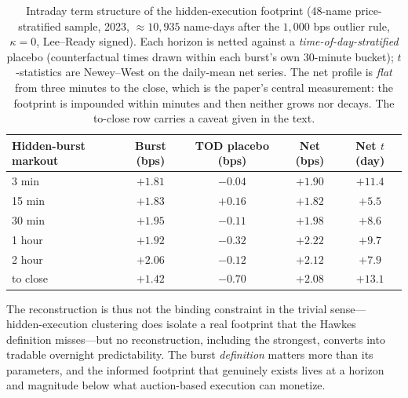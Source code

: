 \documentclass[11pt]{article}
\begin{document}
\begin{table}[htbp]
\centering
\begin{tabular}{lcccc}
\toprule
\textbf{Hidden-burst markout} & \textbf{Burst (bps)} & \textbf{TOD placebo (bps)} & \textbf{Net (bps)} & \textbf{Net $t$ (day)} \\
\midrule
3 min    & $+1.81$ & $-0.04$ & $+1.90$ & $+11.4$ \\
15 min   & $+1.83$ & $+0.16$ & $+1.82$ & $+5.5$ \\
30 min   & $+1.95$ & $-0.11$ & $+1.98$ & $+8.6$ \\
1 hour   & $+1.92$ & $-0.32$ & $+2.22$ & $+9.7$ \\
2 hour   & $+2.06$ & $-0.12$ & $+2.12$ & $+7.9$ \\
to close & $+1.42$ & $-0.70$ & $+2.08$ & $+13.1$ \\
\bottomrule
\end{tabular}
\caption{Intraday term structure of the hidden-execution footprint (48-name price-stratified sample, 2023, $\approx\!10{,}935$ name-days after the $1{,}000$ bps outlier rule, $\kappa=0$, Lee--Ready signed). Each horizon is netted against a \emph{time-of-day-stratified} placebo (counterfactual times drawn within each burst's own 30-minute bucket); $t$-statistics are Newey--West on the daily-mean net series. The net profile is \emph{flat} from three minutes to the close, which is the paper's central measurement: the footprint is impounded within minutes and then neither grows nor decays. The to-close row carries a caveat given in the text.}
\label{tab:hidden_term}
\end{table}

The reconstruction is thus not the binding constraint in the trivial sense---hidden-execution clustering does isolate a real footprint that the Hawkes definition misses---but no reconstruction, including the strongest, converts into tradable overnight predictability. The burst \emph{definition} matters more than its parameters, and the informed footprint that genuinely exists lives at a horizon and magnitude below what auction-based execution can monetize.
\end{document}
